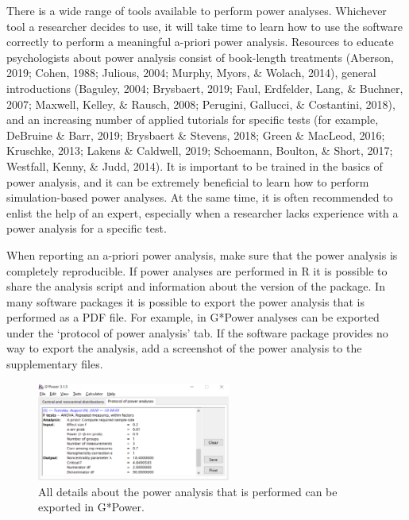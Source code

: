 \documentclass[
  english,
  ,jou, a4paper,floatsintext]{apa6}
\begin{document}
There is a wide range of tools available to perform power analyses. Whichever tool a researcher decides to use, it will take time to learn how to use the software correctly to perform a meaningful a-priori power analysis. Resources to educate psychologists about power analysis consist of book-length treatments (Aberson, 2019; Cohen, 1988; Julious, 2004; Murphy, Myors, \& Wolach, 2014), general introductions (Baguley, 2004; Brysbaert, 2019; Faul, Erdfelder, Lang, \& Buchner, 2007; Maxwell, Kelley, \& Rausch, 2008; Perugini, Gallucci, \& Costantini, 2018), and an increasing number of applied tutorials for specific tests (for example, DeBruine \& Barr, 2019; Brysbaert \& Stevens, 2018; Green \& MacLeod, 2016; Kruschke, 2013; Lakens \& Caldwell, 2019; Schoemann, Boulton, \& Short, 2017; Westfall, Kenny, \& Judd, 2014). It is important to be trained in the basics of power analysis, and it can be extremely beneficial to learn how to perform simulation-based power analyses. At the same time, it is often recommended to enlist the help of an expert, especially when a researcher lacks experience with a power analysis for a specific test.

When reporting an a-priori power analysis, make sure that the power analysis is completely reproducible. If power analyses are performed in R it is possible to share the analysis script and information about the version of the package. In many software packages it is possible to export the power analysis that is performed as a PDF file. For example, in G*Power analyses can be exported under the `protocol of power analysis' tab. If the software package provides no way to export the analysis, add a screenshot of the power analysis to the supplementary files.

\begin{figure}
\includegraphics[width=240px]{images/gpowprotocol} \caption{All details about the power analysis that is performed can be exported in G*Power.}\label{fig:gpowprotocol}
\end{figure}
\end{document}
